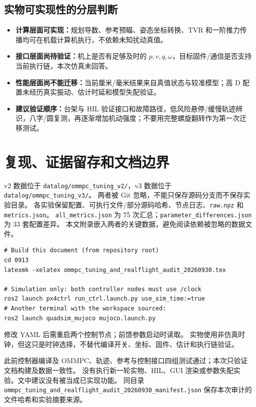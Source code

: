 \documentclass[UTF8,a4paper,11pt,fontset=fandol]{ctexart}
\newcommand{\code}[1]{{\small\nolinkurl{#1}}}
\begin{document}
\subsection{实物可实现性的分层判断}
\begin{itemize}
\item \textbf{计算层面可实现：}规划导数、参考预瞄、姿态坐标转换、TVR 和一阶推力传播均可在机载计算机执行，不依赖未知扰动真值。
\item \textbf{接口层面尚待验证：}机上是否有足够及时的 $p,v,q,\omega$，目标固件/通信是否支持当前执行链，本次仿真未回答。
\item \textbf{性能层面尚不能迁移：}当前厘米/毫米结果来自真值状态与较准模型；高 D 配置未经历真实振动、估计时延和模型失配验证。
\item \textbf{建议验证顺序：}台架与 HIL 验证接口和故障路径，低风险悬停/缓慢轨迹辨识，八字/圆复测，再逐渐增加机动强度；不要用完整螺旋翻转作为第一次迁移测试。
\end{itemize}

\section{复现、证据留存和文档边界}
v2 数据位于 \code{datalog/ommpc_tuning_v2/}，v3 数据位于 \code{datalog/ommpc_tuning_v3/}。
两者被 Git 忽略，不能只保存源码分支而不保存实验目录。
各实验保留配置、可执行文件/部分源码哈希、节点日志、\code{raw.npz} 和 \code{metrics.json}。
\code{all_metrics.json} 为 75 次汇总；\code{parameter_differences.json} 为 33 套配置差异。
本文附录嵌入两者的关键数据，避免阅读依赖被忽略的数据文件。

\begin{lstlisting}
# Build this document (from repository root)
cd 0913
latexmk -xelatex ommpc_tuning_and_realflight_audit_20260930.tex

# Simulation only: both controller nodes must use /clock
ros2 launch px4ctrl run_ctrl.launch.py use_sim_time:=true
# Another terminal with the workspace sourced:
ros2 launch quadsim_mujoco mujoco.launch.py
\end{lstlisting}
修改 YAML 后需重启两个控制节点；前馈参数启动时读取。
实物使用非仿真时钟，但这只是时钟选择，不替代编译开关、坐标、固件、估计和执行链验证。

此前控制器编译及 OMMPC、轨迹、参考与控制接口四组测试通过；本次只验证文档构建及数据一致性。
没有执行新一轮实物、HIL、GUI 渲染或参数失配实验。文中建议没有被当成已实现功能。
同目录 \code{ommpc_tuning_and_realflight_audit_20260930_manifest.json} 保存本次审计的文件哈希和实验摘要来源。
\end{document}
